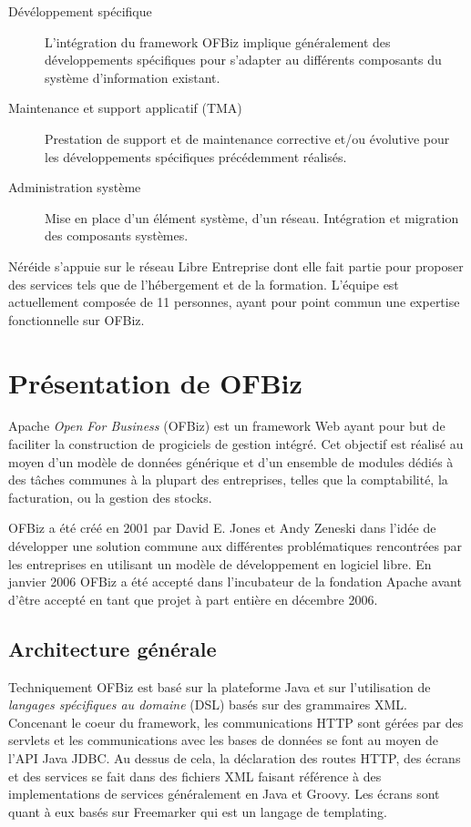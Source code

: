 \documentclass[a4paper, 11pt]{report}
\begin{document}
\begin{description}
\item[Dévéloppement spécifique] L'intégration du framework OFBiz
  implique généralement des développements spécifiques pour s'adapter au
  différents composants du système d'information existant.
\item[Maintenance et support applicatif (TMA)] Prestation de support
  et de maintenance corrective et/ou évolutive pour les développements
  spécifiques précédemment réalisés.
\item[Administration système] Mise en place d'un élément système, d'un
  réseau. Intégration et migration des composants systèmes.
\end{description}

Néréide s'appuie sur le réseau Libre Entreprise dont elle fait partie
pour proposer des services tels que de l'hébergement et de la
formation.  L'équipe est actuellement composée de 11 personnes, ayant
pour point commun une expertise fonctionnelle sur OFBiz.

\chapter{Présentation de OFBiz}

Apache \emph{Open For Business} (OFBiz) est un framework Web ayant
pour but de faciliter la construction de progiciels de gestion
intégré. Cet objectif est réalisé au moyen d'un modèle de données
générique et d'un ensemble de modules dédiés à des tâches communes à
la plupart des entreprises, telles que la comptabilité, la
facturation, ou la gestion des stocks.

OFBiz a été créé en 2001 par David E. Jones et Andy Zeneski dans
l'idée de développer une solution commune aux différentes
problématiques rencontrées par les entreprises en utilisant un modèle
de développement en logiciel libre. En janvier 2006 OFBiz a été
accepté dans l'incubateur de la fondation Apache avant d'être accepté
en tant que projet à part entière en décembre 2006.

\section{Architecture générale}

Techniquement OFBiz est basé sur la plateforme Java et sur
l'utilisation de \emph{langages spécifiques au domaine} (DSL) basés
sur des grammaires XML. Concenant le coeur du framework, les
communications HTTP sont gérées par des servlets
\cite{chan2017servlet} et les communications avec les bases de données
se font au moyen de l'API Java JDBC. Au dessus de cela, la déclaration
des routes HTTP, des écrans et des services se fait dans des fichiers
XML faisant référence à des implementations de services généralement
en Java et Groovy. Les écrans sont quant à eux basés sur Freemarker
qui est un langage de templating.
\end{document}
